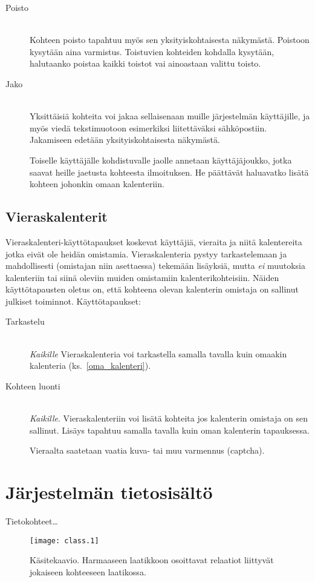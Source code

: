 \documentclass[a4paper,12pt]{report}
\begin{document}
\begin{description}
   \item[Poisto]\hfill\\
      Kohteen poisto tapahtuu myös sen yksityiskohtaisesta näkymästä.  Poistoon
      kysytään aina varmistus.  Toistuvien kohteiden kohdalla kysytään,
      halutaanko poistaa kaikki toistot vai ainoastaan valittu toisto.

   \item[Jako]\hfill\\
      Yksittäisiä kohteita voi jakaa sellaisenaan muille järjestelmän
      käyttäjille, ja myös viedä tekstimuotoon esimerkiksi liitettäväksi
      sähköpostiin.  Jakamiseen edetään yksityiskohtaisesta näkymästä. 

      Toiselle käyttäjälle kohdistuvalle jaolle annetaan käyttäjäjoukko, jotka
      saavat heille jaetusta kohteesta ilmoituksen.  He päättävät haluavatko
      lisätä kohteen johonkin omaan kalenteriin.
\end{description}

\subsection{Vieraskalenterit}
Vieraskalenteri-käyttötapaukset koskevat käyttäjiä, vieraita ja niitä
kalentereita jotka eivät ole heidän omistamia.  Vieraskalenteria pystyy
tarkastelemaan ja mahdollisesti (omistajan niin asettaessa) tekemään lisäyksiä,
mutta \emph{ei} muutoksia kalenteriin tai siinä oleviin muiden omistamiin
kalenterikohteisiin.  Näiden käyttötapausten oletus on, että kohteena olevan
kalenterin omistaja on sallinut julkiset toiminnot.  Käyttötapaukset:
\begin{description}
   \item[Tarkastelu]\hfill\\
      \textit{Kaikille} Vieraskalenteria voi tarkastella samalla tavalla kuin
      omaakin kalenteria (ks.~\ref{oma_kalenteri}).
   \item[Kohteen luonti]\hfill\\
      \textit{Kaikille}. Vieraskalenteriin voi lisätä kohteita jos kalenterin
      omistaja on sen sallinut.  Lisäys tapahtuu samalla tavalla kuin oman
      kalenterin tapauksessa. 

      Vieraalta saatetaan vaatia kuva- tai muu varmennus (captcha).
\end{description}

\section{Järjestelmän tietosisältö}
Tietokohteet\ldots
\begin{figure}[ht]
   \centering \texttt{[image: class.1]}
   \caption{Käsitekaavio. Harmaaseen laatikkoon osoittavat relaatiot liittyvät
   jokaiseen kohteeseen laatikossa.}
   \label{graph_ui}
\end{figure}
\end{document}
